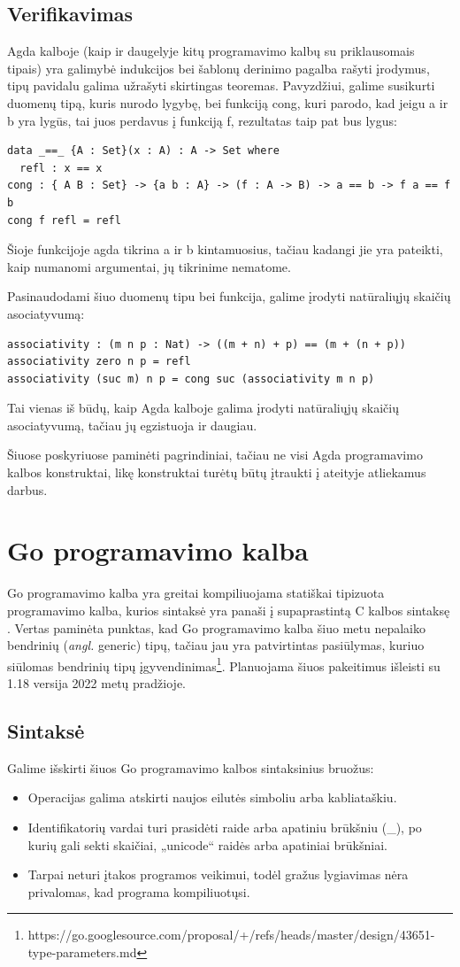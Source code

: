 \documentclass{VUMIFPSkursinis}
\begin{document}
\subsection{Verifikavimas}
Agda kalboje (kaip ir daugelyje kitų programavimo kalbų su priklausomais tipais) yra galimybė indukcijos bei šablonų derinimo pagalba rašyti įrodymus, tipų pavidalu galima užrašyti skirtingas teoremas. Pavyzdžiui, galime susikurti duomenų tipą, kuris nurodo lygybę, bei funkciją cong, kuri parodo, kad jeigu a ir b yra lygūs, tai juos perdavus į funkciją f, rezultatas taip pat bus lygus:
\begin{lstlisting}
data _==_ {A : Set}(x : A) : A -> Set where
  refl : x == x
cong : { A B : Set} -> {a b : A} -> (f : A -> B) -> a == b -> f a == f b
cong f refl = refl
	\end{lstlisting}
Šioje funkcijoje agda tikrina a ir b kintamuosius, tačiau kadangi jie yra pateikti, kaip numanomi argumentai, jų tikrinime nematome.\par Pasinaudodami šiuo duomenų tipu bei funkcija, galime įrodyti natūraliųjų  skaičių asociatyvumą:
\begin{lstlisting}
associativity : (m n p : Nat) -> ((m + n) + p) == (m + (n + p))
associativity zero n p = refl
associativity (suc m) n p = cong suc (associativity m n p)
\end{lstlisting}
Tai vienas iš būdų, kaip Agda kalboje galima įrodyti natūraliųjų skaičių asociatyvumą, tačiau jų egzistuoja ir daugiau.
\par Šiuose poskyriuose paminėti pagrindiniai, tačiau ne visi Agda programavimo kalbos konstruktai, likę konstruktai turėtų būtų įtraukti į ateityje atliekamus darbus.
\section{Go programavimo kalba}
Go programavimo kalba yra greitai kompiliuojama statiškai tipizuota programavimo kalba, kurios sintaksė yra panaši į supaprastintą C kalbos sintaksę \cite{Go}. Vertas paminėta punktas, kad Go programavimo kalba šiuo metu nepalaiko bendrinių (\textit{angl.} generic) tipų, tačiau jau yra patvirtintas pasiūlymas, kuriuo siūlomas bendrinių tipų įgyvendinimas\footnote{https://go.googlesource.com/proposal/+/refs/heads/master/design/43651-type-parameters.md}. Planuojama šiuos pakeitimus išleisti su 1.18 versija 2022 metų pradžioje.
\subsection{Sintaksė}
Galime išskirti šiuos Go programavimo kalbos sintaksinius bruožus:
\begin{itemize}
	\item Operacijas galima atskirti naujos eilutės simboliu arba kabliataškiu.
	\item Identifikatorių vardai turi prasidėti raide arba apatiniu brūkšniu (\_), po kurių gali sekti skaičiai, „unicode“ raidės arba apatiniai brūkšniai.
	\item Tarpai neturi įtakos programos veikimui, todėl gražus lygiavimas nėra privalomas, kad programa kompiliuotųsi.
\end{itemize}
\end{document}
